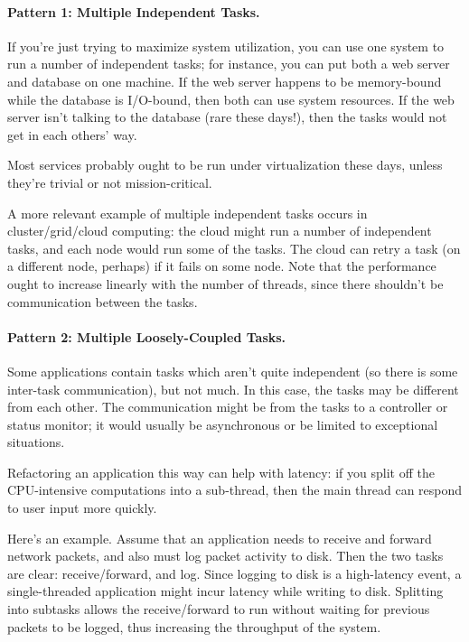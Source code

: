 \documentclass[a4paper]{report}
\begin{document}
\paragraph{Pattern 1: Multiple Independent Tasks.} If you're just trying to maximize
system utilization, you can use one system to run a number of independent
tasks; for instance, you can put both a web server and database on
one machine. If the web server happens to be memory-bound while the
database is I/O-bound, then both can use system resources. If the web
server isn't talking to the database (rare these days!), then the tasks
would not get in each others' way.

Most services probably ought to be run under virtualization these
days, unless they're trivial or not mission-critical.

A more relevant example of multiple independent tasks occurs in
cluster/grid/cloud computing: the cloud might run a number of
independent tasks, and each node would run some of the tasks. The
cloud can retry a task (on a different node, perhaps) if it fails on
some node. Note that the performance ought to increase linearly with
the number of threads, since there shouldn't be communication between
the tasks.

\paragraph{Pattern 2: Multiple Loosely-Coupled Tasks.} Some applications contain
tasks which aren't quite independent (so there is some inter-task
communication), but not much.  In this case, the tasks may be
different from each other. The communication might be from the tasks
to a controller or status monitor; it would usually be asynchronous or
be limited to exceptional situations.

Refactoring an application this way can help with latency: if you 
split off the CPU-intensive computations into a sub-thread, then
the main thread can respond to user input more quickly.

Here's an example. Assume that an application needs to receive and
forward network packets, and also must log packet activity to disk.
Then the two tasks are clear: receive/forward, and log. Since logging
to disk is a high-latency event, a single-threaded application might
incur latency while writing to disk. Splitting into subtasks allows
the receive/forward to run without waiting for previous packets to be
logged, thus increasing the throughput of the system.
\end{document}
